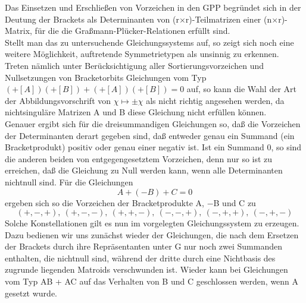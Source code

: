 Das Einsetzen und Erschließen von Vorzeichen in den GPP begründet sich
in der Deutung der Brackets als Determinanten von (r$\times$r)-Teilmatrizen
einer (n$\times$r)-Matrix, für die die Graßmann-Plücker-Relationen erfüllt
sind.\\
Stellt man das zu untersuchende Gleichungssystems auf, so zeigt sich noch eine
weitere Möglichkeit, auftretende Symmetrietypen als unsinnig zu erkennen.
Treten nämlich unter Berücksichtigung aller Sortierungsvorzeichen und
Nullsetzungen von Bracketorbits Gleichungen vom Typ
$(+[A])(+[B]) + (+[A])(+[B]) = 0$ auf, so kann die Wahl der Art der
Abbildungsvorschrift von $\chi\mapsto\pm\chi$ als nicht richtig angesehen
werden, da nichtsinguläre Matrizen A und B diese Gleichung nicht erfüllen
können.\\
Genauer ergibt sich für die dreisummandigen Gleichungen so, daß die
Vorzeichen der Determinanten derart gegeben sind, daß entweder genau ein
Summand (ein Bracketprodukt) positiv oder genau einer negativ ist. Ist ein
Summand 0, so sind die anderen beiden von entgegengesetztem Vorzeichen, denn nur
so ist zu erreichen, daß die Gleichung zu Null werden kann, wenn alle
Determinanten nichtnull sind. Für die Gleichungen
$$ A + (-B) + C = 0$$
ergeben sich so die Vorzeichen der Bracketprodukte A, $-$B und C zu
$$(+,-,+),~(+,-,-),~(+,+,-),~(-,-,+),~(-,+,+),~(-,+,-)$$
Solche Konstellationen gilt es nun im vorgelegten Gleichungssystem zu erzeugen.
Dazu bedienen wir uns zunächst wieder der Gleichungen, die nach dem Ersetzen
der Brackets durch ihre Repräsentanten unter G nur noch zwei Summanden
enthalten, die nichtnull sind, während der dritte durch eine Nichtbasis des
zugrunde liegenden Matroids verschwunden ist. Wieder kann bei Gleichungen
vom Typ AB + AC auf das Verhalten von B und C geschlossen werden, wenn A
gesetzt wurde.

